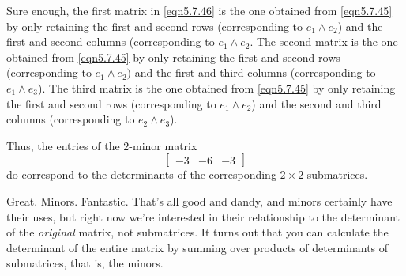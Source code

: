 \begin{exm}{}{}
	Sure enough, the first matrix in \eqref{eqn5.7.46} is the one obtained from \eqref{eqn5.7.45} by only retaining the first and second rows (corresponding to $e_1\wedge e_2$) and the first and second columns (corresponding to $e_1\wedge e_2$.  The second matrix is the one obtained from \eqref{eqn5.7.45} by only retaining the first and second rows (corresponding to $e_1\wedge e_2)$ and the first and third columns (corresponding to $e_1\wedge e_3$).  The third matrix is the one obtained from \eqref{eqn5.7.45} by only retaining the first and second rows (corresponding to $e_1\wedge e_2$) and the second and third columns (corresponding to $e_2\wedge e_3$).
	
	Thus, the entries of the $2$-minor matrix
	\begin{equation}
		\begin{bmatrix}-3 & -6 & -3\end{bmatrix}
	\end{equation}
	do correspond to the determinants of the corresponding $2\times 2$ submatrices.
\end{exm}
Great.  Minors.  Fantastic.  That's all good and dandy, and minors certainly have their uses, but right now we're interested in their relationship to the determinant of the \emph{original} matrix, not submatrices.  It turns out that you can calculate the determinant of the entire matrix by summing over products of determinants of submatrices, that is, the minors.
